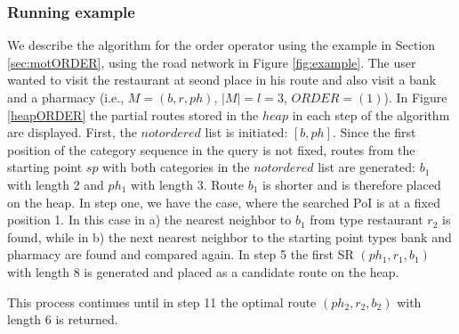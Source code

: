\subsubsection{Running example}
We describe the algorithm for the order operator using the example in Section \ref{sec:motORDER}, using the road network in Figure \ref{fig:example}. The user wanted to visit the restaurant at seond place in his route and also visit a bank and a pharmacy (i.e., $M = (b, r, ph)$, $|M| = l = 3$, $ORDER = (1)$). In Figure \ref{heapORDER} the partial routes stored in the $heap$ in each step of the algorithm are displayed.
First, the $notordered$ list is initiated: $[b, ph]$. Since the first position of the category sequence in the query is not fixed, routes from the starting point $sp$ with both categories in the $notordered$ list are generated: $b_1$ with length 2 and $ph_1$ with length 3. Route $b_1$ is shorter and is therefore placed on the heap. In step one, we have the case, where the searched PoI is at a fixed position 1. In this case in a) the nearest neighbor to $b_1$ from type restaurant $r_2$ is found, while in b) the next nearest neighbor to the starting point types bank and pharmacy are found and compared again. In step 5 the first SR $(ph_1, r_1, b_1)$ with length 8 is generated and placed as a candidate route on the heap.

This process continues until in step 11 the optimal route $(ph_2, r_2, b_2)$ with length 6 is returned.

